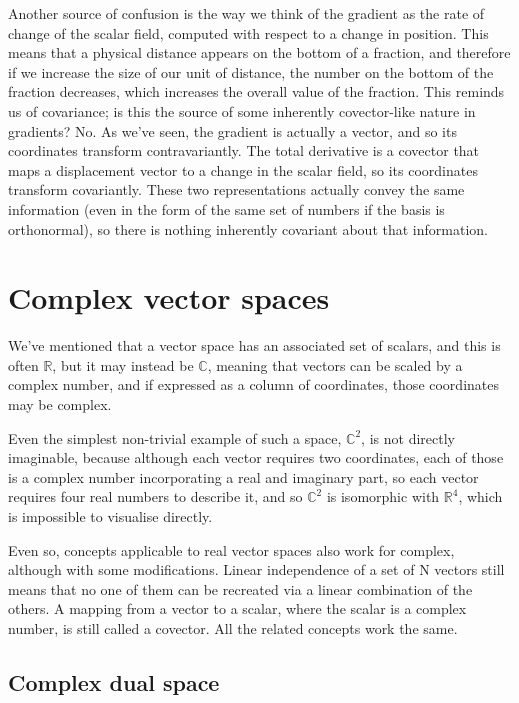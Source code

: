 Another source of confusion is the way we think of the gradient as the rate of change of the scalar field, computed with respect to a change in position. This means that a physical distance appears on the bottom of a fraction, and therefore if we increase the size of our unit of distance, the number on the bottom of the fraction decreases, which increases the overall value of the fraction. This reminds us of covariance; is this the source of some inherently covector-like nature in gradients? No. As we've seen, the gradient is actually a vector, and so its coordinates transform contravariantly. The total derivative is a covector that maps a displacement vector to a change in the scalar field, so its coordinates transform covariantly. These two representations actually convey the same information (even in the form of the same set of numbers if the basis is orthonormal), so there is nothing inherently covariant about that information.

\section{Complex vector spaces}\label{sec:vectors-complex}

We've mentioned that a vector space has an associated set of scalars, and this is often $\mathbb{R}$, but it may instead be $\mathbb{C}$, meaning that vectors can be scaled by a complex number, and if expressed as a column of coordinates, those coordinates may be complex.

Even the simplest non-trivial example of such a space, $\mathbb{C}^2$, is not directly imaginable, because although each vector requires two coordinates, each of those is a complex number incorporating a real and imaginary part, so each vector requires four real numbers to describe it, and so $\mathbb{C}^2$ is isomorphic with $\mathbb{R}^4$, which is impossible to visualise directly.

Even so, concepts applicable to real vector spaces also work for complex, although with some modifications. Linear independence of a set of N vectors still means that no one of them can be recreated via a linear combination of the others. A mapping from a vector to a scalar, where the scalar is a complex number, is still called a covector. All the related concepts work the same.

\subsection{Complex dual space}

